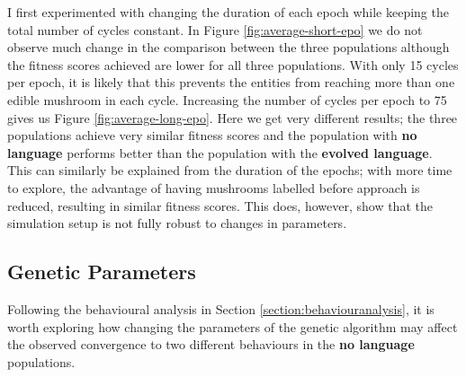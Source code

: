 \documentclass[12pt,a4paper,twoside,openright]{report}
\begin{document}
I first experimented with changing the duration of each epoch while keeping the total number of cycles constant. In Figure \ref{fig:average-short-epo} we do not observe much change in the comparison between the three populations although the fitness scores achieved are lower for all three populations. With only 15 cycles per epoch, it is likely that this prevents the entities from reaching more than one edible mushroom in each cycle. Increasing the number of cycles per epoch to 75 gives us Figure \ref{fig:average-long-epo}. Here we get very different results; the three populations achieve very similar fitness scores and the population with {\bf no language} performs better than the population with the {\bf evolved language}. This can similarly be explained from the duration of the epochs; with more time to explore, the advantage of having mushrooms labelled before approach is reduced, resulting in similar fitness scores. This does, however, show that the simulation setup is not fully robust to changes in parameters.
 
 \subsection{Genetic Parameters}
 
Following the behavioural analysis in Section \ref{section:behaviouranalysis}, it is worth exploring how changing the parameters of the genetic algorithm may affect the observed convergence to two different behaviours in the {\bf no language} populations.
\end{document}
